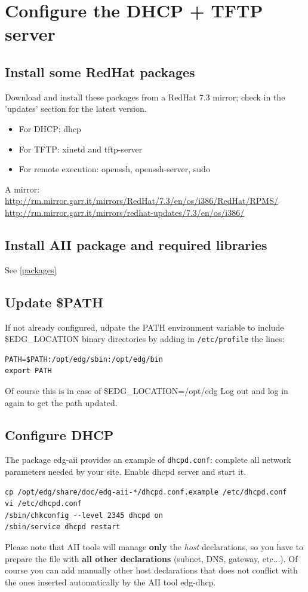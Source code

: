 \documentclass{datagridreport}
\begin{document}
\section{Configure the DHCP + TFTP server}
\subsection{Install some RedHat packages} %
Download and install these packages from a RedHat 7.3 mirror; check in the 'updates' section
for the latest version.
\begin{itemize}
\item For DHCP: dhcp
\item For TFTP: xinetd and tftp-server
\item For remote execution: openssh, openssh-server, sudo
\end{itemize}
A mirror:\\
\url{http://rm.mirror.garr.it/mirrors/RedHat/7.3/en/os/i386/RedHat/RPMS/}\\
\url{http://rm.mirror.garr.it/mirrors/redhat-updates/7.3/en/os/i386/}

\subsection{Install AII package and required libraries} %
See \ref{packages}

\subsection{Update \$PATH}\label{path} %
If not already configured, udpate the PATH environment variable to include \$EDG\_LOCATION binary
directories by adding in \texttt{/etc/profile} the lines:
\begin{verbatim}
PATH=$PATH:/opt/edg/sbin:/opt/edg/bin
export PATH
\end{verbatim}
Of course this is in case of \$EDG\_LOCATION=/opt/edg
Log out and log in again to get the path updated.

\subsection{Configure DHCP}\label{dhcp} %
The package edg-aii provides an example of \texttt{dhcpd.conf}: complete all network parameters
needed by your site. Enable dhcpd server and start it.
\begin{verbatim}
cp /opt/edg/share/doc/edg-aii-*/dhcpd.conf.example /etc/dhcpd.conf
vi /etc/dhcpd.conf
/sbin/chkconfig --level 2345 dhcpd on
/sbin/service dhcpd restart
\end{verbatim}
Please note that AII tools will manage  \textbf{only} the \emph{host} declarations,
so you have to prepare the file with \textbf{all other declarations} (subnet, DNS, gateway, etc...).
Of course you can add manually other host declarations that does not conflict with the
ones inserted automatically by the AII tool edg-dhcp.
\end{document}

